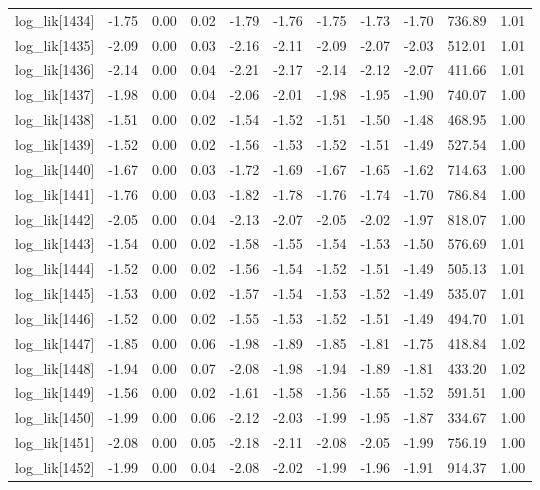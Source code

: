 \begin{table}[ht]
\begin{tabular}{rrrrrrrrrrr}
  log\_lik[1434] & -1.75 & 0.00 & 0.02 & -1.79 & -1.76 & -1.75 & -1.73 & -1.70 & 736.89 & 1.01 \\ 
  log\_lik[1435] & -2.09 & 0.00 & 0.03 & -2.16 & -2.11 & -2.09 & -2.07 & -2.03 & 512.01 & 1.01 \\ 
  log\_lik[1436] & -2.14 & 0.00 & 0.04 & -2.21 & -2.17 & -2.14 & -2.12 & -2.07 & 411.66 & 1.01 \\ 
  log\_lik[1437] & -1.98 & 0.00 & 0.04 & -2.06 & -2.01 & -1.98 & -1.95 & -1.90 & 740.07 & 1.00 \\ 
  log\_lik[1438] & -1.51 & 0.00 & 0.02 & -1.54 & -1.52 & -1.51 & -1.50 & -1.48 & 468.95 & 1.00 \\ 
  log\_lik[1439] & -1.52 & 0.00 & 0.02 & -1.56 & -1.53 & -1.52 & -1.51 & -1.49 & 527.54 & 1.00 \\ 
  log\_lik[1440] & -1.67 & 0.00 & 0.03 & -1.72 & -1.69 & -1.67 & -1.65 & -1.62 & 714.63 & 1.00 \\ 
  log\_lik[1441] & -1.76 & 0.00 & 0.03 & -1.82 & -1.78 & -1.76 & -1.74 & -1.70 & 786.84 & 1.00 \\ 
  log\_lik[1442] & -2.05 & 0.00 & 0.04 & -2.13 & -2.07 & -2.05 & -2.02 & -1.97 & 818.07 & 1.00 \\ 
  log\_lik[1443] & -1.54 & 0.00 & 0.02 & -1.58 & -1.55 & -1.54 & -1.53 & -1.50 & 576.69 & 1.01 \\ 
  log\_lik[1444] & -1.52 & 0.00 & 0.02 & -1.56 & -1.54 & -1.52 & -1.51 & -1.49 & 505.13 & 1.01 \\ 
  log\_lik[1445] & -1.53 & 0.00 & 0.02 & -1.57 & -1.54 & -1.53 & -1.52 & -1.49 & 535.07 & 1.01 \\ 
  log\_lik[1446] & -1.52 & 0.00 & 0.02 & -1.55 & -1.53 & -1.52 & -1.51 & -1.49 & 494.70 & 1.01 \\ 
  log\_lik[1447] & -1.85 & 0.00 & 0.06 & -1.98 & -1.89 & -1.85 & -1.81 & -1.75 & 418.84 & 1.02 \\ 
  log\_lik[1448] & -1.94 & 0.00 & 0.07 & -2.08 & -1.98 & -1.94 & -1.89 & -1.81 & 433.20 & 1.02 \\ 
  log\_lik[1449] & -1.56 & 0.00 & 0.02 & -1.61 & -1.58 & -1.56 & -1.55 & -1.52 & 591.51 & 1.00 \\ 
  log\_lik[1450] & -1.99 & 0.00 & 0.06 & -2.12 & -2.03 & -1.99 & -1.95 & -1.87 & 334.67 & 1.00 \\ 
  log\_lik[1451] & -2.08 & 0.00 & 0.05 & -2.18 & -2.11 & -2.08 & -2.05 & -1.99 & 756.19 & 1.00 \\ 
  log\_lik[1452] & -1.99 & 0.00 & 0.04 & -2.08 & -2.02 & -1.99 & -1.96 & -1.91 & 914.37 & 1.00 \\ 

\end{tabular}
\end{table}
